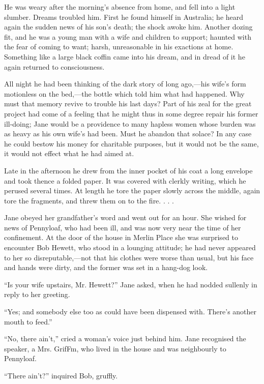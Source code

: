 He was weary after the morning's absence from home, and fell into a
light slumber. Dreams troubled him. First he found himself in Australia;
he heard again the sudden news of his son's death; the shock awoke him.
Another dozing fit, and he was a young man with a wife and children to
support; haunted with the fear of coming to want; harsh, unreasonable in
his exactions at home. Something like a large black coffin came into his
dream, and in dread of it he again returned to consciousness.

All night he had been thinking of the dark story of long ago,---his
wife's form motionless on the bed,---the bottle which told him what had
happened. Why must that memory revive to trouble his last days? Part of
his zeal for the great project had come of a feeling that he might thus
in some degree repair his former ill-doing; Jane would be a providence
to many hapless women whose burden was as heavy as
{\protect\hypertarget{144}{}{}}his own wife's had been. Must he abandon
that solace? In any case he could bestow his money for charitable
purposes, but it would not be the same, it would not effect what he had
aimed at.

Late in the afternoon he drew from the inner pocket of his coat a long
envelope and took thence a folded paper. It was covered with clerkly
writing, which he perused several times. At length he tore the paper
slowly across the middle, again tore the fragments, and threw them on to
the fire. . . .

Jane obeyed her grandfather's word and went out for an hour. She wished
for news of Pennyloaf, who had been ill, and was now very near the time
of her confinement. At the door of the house in Merlin Place she was
surprised to encounter Bob Hewett, who stood in a lounging attitude; he
had never appeared to her so disreputable,---not that his clothes were
worse than usual, but his face and hands were dirty, and the former was
set in a hang-dog look.

``Is your wife upstairs, Mr. Hewett?'' Jane asked, when he had nodded
sullenly in reply to her greeting.

{\protect\hypertarget{145}{}{}}``Yes; and somebody else too as could
have been dispensed with. There's another mouth to feed.''

``No, there ain't,'' cried a woman's voice just behind him. Jane
recognised the speaker, a Mrs. GrifFm, who lived in the house and was
neighbourly to Pennyloaf.

``There ain't?'' inquired Bob, gruffly.

